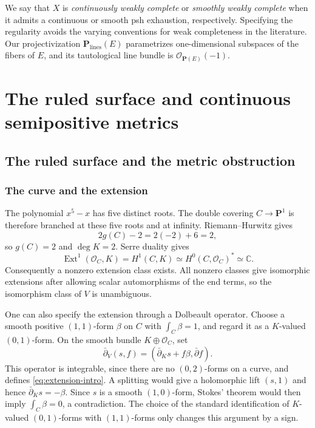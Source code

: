 \documentclass[11pt]{amsart}
\theoremstyle{definition}
\theoremstyle{remark}
\numberwithin{equation}{section}
\newcommand{\C}{\mathbb C}
\newcommand{\PP}{\mathbf P}
\newcommand{\OO}{\mathcal O}
\newcommand{\barp}{\bar\partial}
\begin{document}
We say that $X$ is \emph{continuously weakly complete} or
\emph{smoothly weakly complete} when it admits a continuous or smooth
psh exhaustion, respectively. Specifying the regularity avoids the
varying conventions for weak completeness in the literature.
Our projectivization $\PP_{\mathrm{lines}}(E)$ parametrizes
one-dimensional subspaces of the fibers of $E$, and its tautological
line bundle is $\OO_{\PP(E)}(-1)$.

\section{The ruled surface and continuous semipositive metrics}\label{sec:metrics}

\subsection{The ruled surface and the metric obstruction}\label{sec:ruled}

\subsubsection{The curve and the extension}

The polynomial $x^5-x$ has five distinct roots. The double covering
$C\to\PP^1$ is therefore branched at these five roots and at infinity.
Riemann--Hurwitz gives
\[
 2g(C)-2=2(-2)+6=2,
\]
so $g(C)=2$ and $\deg K=2$. Serre duality gives
\[
 \operatorname{Ext}^1(\OO_C,K)=H^1(C,K)
 \simeq H^0(C,\OO_C)^*\simeq\C.
\]
Consequently a nonzero extension class exists. All nonzero classes give
isomorphic extensions after allowing scalar automorphisms of the end
terms, so the isomorphism class of $V$ is unambiguous.

One can also specify the extension through a Dolbeault operator. Choose
a smooth positive $(1,1)$-form $\beta$ on $C$ with
$\int_C\beta=1$, and regard it as a $K$-valued $(0,1)$-form. On the
smooth bundle $K\oplus\OO_C$, set
\begin{equation}\label{eq:dolbeault-extension}
 \barp_V(s,f)=(\barp_Ks+f\beta,\barp f).
\end{equation}
This operator is integrable, since there are no $(0,2)$-forms on a
curve, and defines \eqref{eq:extension-intro}. A splitting would give a
holomorphic lift $(s,1)$ and hence $\barp_Ks=-\beta$. Since $s$ is a
smooth $(1,0)$-form, Stokes' theorem would then imply
$\int_C\beta=0$, a contradiction. The choice of the standard
identification of $K$-valued $(0,1)$-forms with $(1,1)$-forms only changes
this argument by a sign.
\end{document}
